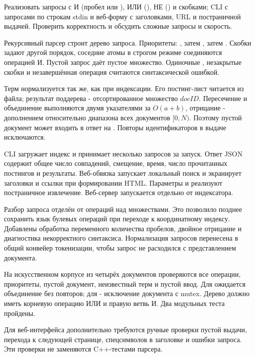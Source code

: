 \task
Реализовать запросы с И (пробел или \code{&&}), ИЛИ (\code{||}),
НЕ (\code{!}) и скобками; CLI с запросами по строкам stdin и веб-форму
с заголовками, URL и постраничной выдачей. Проверить корректность
и обсудить сложные запросы и скорость.

\method
Рекурсивный парсер строит дерево запроса. Приоритеты:
\code{!}, затем \code{&&}, затем \code{||}. Скобки задают другой
порядок, соседние атомы в строгом режиме соединяются операцией И.
Пустой запрос даёт пустое множество. Одиночные \code{&}, незакрытые
скобки и незавершённая операция считаются синтаксической ошибкой.

Терм нормализуется так же, как при индексации. Его постинг-лист читается
из файла; результат поддерева - отсортированное множество \(docID\).
Пересечение и объединение выполняются двумя указателями за
\(O(a+b)\), отрицание - дополнением относительно диапазона всех
документов \([0,N)\). Поэтому пустой документ может входить в ответ
на . Повторы идентификаторов в выдаче исключаются.

CLI загружает индекс и принимает несколько запросов за запуск.
Ответ JSON содержит общее число совпадений, смещение, время,
число прочитанных постингов и результаты. Веб-обвязка запускает
локальный поиск и экранирует заголовки и ссылки при формировании HTML.
Параметры  и  реализуют
постраничное извлечение. Веб-сервер запускается отдельно от индексатора.

\journal
Разбор запроса отделён от операций над множествами. Это позволило
позднее сохранить язык булевых операций при переходе к координатному
индексу. Добавлены обработка переменного количества пробелов,
двойное отрицание и диагностика некорректного синтаксиса.
Нормализация запросов перенесена в общий конвейер токенизации,
чтобы запрос не расходился с представлением документа.

\testing
На искусственном корпусе из четырёх документов проверяются все
операции, приоритеты, пустой документ, неизвестный терм и пустой ввод.
Для  ожидается объединение без повторов;
для  - исключение документа с mutex.
Дерево  должно иметь корневую операцию
ИЛИ и правую ветвь И. Два модульных теста пройдены.

Для веб-интерфейса дополнительно требуются ручные проверки пустой
выдачи, перехода к следующей странице, спецсимволов в заголовке
и ошибки запроса. Эти проверки не заменяются C++-тестами парсера.

